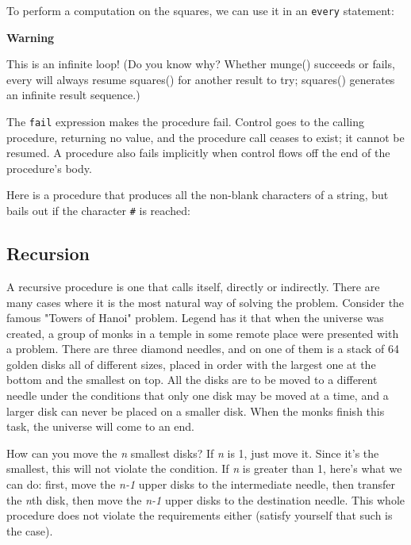 To perform a computation on the squares, we can use it in an
\texttt{every} statement:


{\sffamily\bfseries
Warning}

{\sffamily
This is an infinite loop! (Do you know why? Whether munge() succeeds or
fails, \textrm{every} will always resume squares() for another result
to try; squares() generates an infinite result sequence.)}

The \texttt{fail} expression makes the
procedure fail. Control goes to the calling procedure, returning
no value, and the procedure call ceases to exist; it cannot be
resumed. A procedure also fails implicitly when control flows off the
end of the procedure's body.

Here is a procedure that produces all the non-blank characters of a
string, but bails out if the character \texttt{\#} is reached:


\subsection*{Recursion}

A recursive procedure is one that calls itself,
directly or indirectly. There are many cases where it is the most
natural way of solving the problem. Consider the famous
"Towers of Hanoi" problem.
Legend has it that when the universe was created, a group of monks
in a temple in some remote place were presented with a problem.
There are three diamond needles, and on one of them is a
stack of 64 golden disks all of different sizes, placed in
order with the largest one at the bottom and the smallest on top. All
the disks are to be moved to a different needle under the conditions
that only one disk may be moved at a time, and a larger disk can never
be placed on a smaller disk. When the monks finish this task, the
universe will come to an end.

How can you move the \textit{n} smallest disks? If \textit{n} is
1, just move it. Since it's the
smallest, this will not violate the condition. If \textit{n} is
greater than 1, here's what we can do: first, move the
\textit{n-1} upper disks to the intermediate needle, then transfer the
\textit{n}th disk, then move the \textit{n-1} upper disks to the
destination needle. This whole procedure does not violate the
requirements either (satisfy yourself that such is the case).

